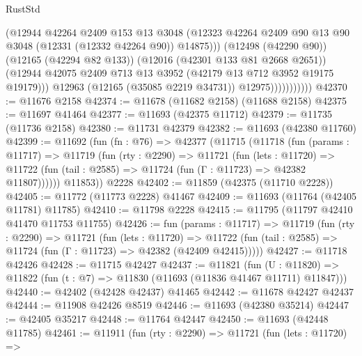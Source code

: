 \begin{lexlean}{RustStd}
\begin{coremodule}
                              (@12944
                                @42264
                                @2409
                                @153
                                @13
                                @3048
                                (@12323
                                  @42264
                                  @2409
                                  @90
                                  @13
                                  @90
                                  @3048
                                  (@12331 (@12332 @42264 @90))
                                  @14875)))
                            (@12498 (@42290 @90))
                            (@12165 (@42294 @82 @133))
                            (@12016 (@42301 @133 @81 @2668 @2651))
                            (@12944
                              @42075
                              @2409
                              @713
                              @13
                              @3952
                              (@42179 @13 @712 @3952 @19175 @19179)))
                          @12963
                          (@12165 (@35085 @2219 @34731))
                          @12975)))))))))))
@42370 := @11676 @2158
@42374 := @11678 (@11682 @2158) (@11688 @2158)
@42375 := @11697 @41464
@42377 := @11693 (@42375 @11712)
@42379 := @11735 (@11736 @2158)
@42380 := @11731 @42379
@42382 := @11693 (@42380 @11760)
@42399 := @11692
    (fun (fn : @76) =>
    @42377
      (@11715
        (@11718
          (fun (params : @11717) =>
          @11719
            (fun (rty : @2290) =>
            @11721
              (fun (lets : @11720) =>
              @11722 (fun (tail : @2585) => @11724 (fun (Γ : @11723) => @42382 @11807))))))
        @11853))
    @2228
@42402 := @11859 (@42375 (@11710 @2228))
@42405 := @11772 (@11773 @2228) @41467
@42409 := @11693 (@11764 (@42405 @11781) @11785)
@42410 := @11798 @2228
@42415 := @11795 (@11797 @42410 @41470 @11753 @11755)
@42426 := fun (params : @11717) =>
  @11719
    (fun (rty : @2290) =>
    @11721
      (fun (lets : @11720) =>
      @11722 (fun (tail : @2585) => @11724 (fun (Γ : @11723) => @42382 (@42409 @42415)))))
@42427 := @11718 @42426
@42428 := @11715 @42427
@42437 := @11821
    (fun (U : @11820) => @11822 (fun (t : @7) => @11830 (@11693 (@11836 @41467 @11711) @11847)))
@42440 := @42402 (@42428 @42437) @41465
@42442 := @11678 @42427 @42437
@42444 := @11908 @42426 @8519
@42446 := @11693 (@42380 @35214)
@42447 := @42405 @35217
@42448 := @11764 @42447
@42450 := @11693 (@42448 @11785)
@42461 := @11911
    (fun (rty : @2290) =>
    @11721
      (fun (lets : @11720) =>

\end{coremodule}
\end{lexlean}
